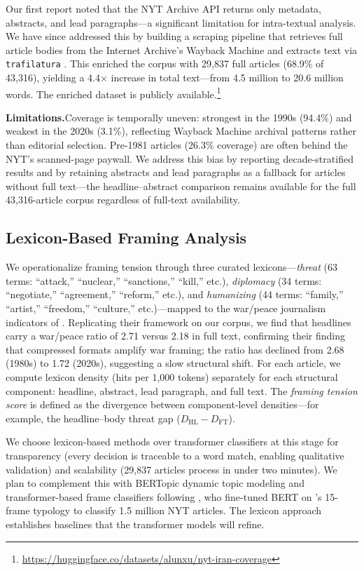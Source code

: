 \documentclass{dhnbpub}
\begin{document}
Our first report noted that the NYT Archive API returns only metadata, abstracts, and lead paragraphs---a significant limitation for intra-textual analysis. We have since addressed this by building a scraping pipeline that retrieves full article bodies from the Internet Archive's Wayback Machine and extracts text via \texttt{trafilatura} \citep{Barbaresi2021}. This enriched the corpus with 29,837 full articles (68.9\% of 43,316), yielding a 4.4$\times$ increase in total text---from 4.5 million to 20.6 million words. The enriched dataset is publicly available.\footnote{\url{https://huggingface.co/datasets/alunxu/nyt-iran-coverage}}

\textbf{Limitations.}\quad Coverage is temporally uneven: strongest in the 1990s (94.4\%) and weakest in the 2020s (3.1\%), reflecting Wayback Machine archival patterns rather than editorial selection. Pre-1981 articles (26.3\% coverage) are often behind the NYT's scanned-page paywall. We address this bias by reporting decade-stratified results and by retaining abstracts and lead paragraphs as a fallback for articles without full text---the headline--abstract comparison remains available for the full 43,316-article corpus regardless of full-text availability.

\subsection{Lexicon-Based Framing Analysis}

We operationalize framing tension through three curated lexicons---\emph{threat} (63 terms: ``attack,'' ``nuclear,'' ``sanctions,'' ``kill,'' etc.), \emph{diplomacy} (34 terms: ``negotiate,'' ``agreement,'' ``reform,'' etc.), and \emph{humanizing} (44 terms: ``family,'' ``artist,'' ``freedom,'' ``culture,'' etc.)---mapped to the war/peace journalism indicators of \citet{LeeMaslog2005}. Replicating their framework on our corpus, we find that headlines carry a war/peace ratio of 2.71 versus 2.18 in full text, confirming their finding that compressed formats amplify war framing; the ratio has declined from 2.68 (1980s) to 1.72 (2020s), suggesting a slow structural shift. For each article, we compute lexicon density (hits per 1,000 tokens) separately for each structural component: headline, abstract, lead paragraph, and full text. The \emph{framing tension score} is defined as the divergence between component-level densities---for example, the headline--body threat gap ($D_{\text{HL}} - D_{\text{FT}}$).

We choose lexicon-based methods over transformer classifiers at this stage for transparency (every decision is traceable to a word match, enabling qualitative validation) and scalability (29,837 articles process in under two minutes). We plan to complement this with BERTopic dynamic topic modeling \citep{Grootendorst2022} and transformer-based frame classifiers following \citet{Kwak2020}, who fine-tuned BERT on \citeauthor{Card2015}'s \citeyearpar{Card2015} 15-frame typology to classify 1.5 million NYT articles. The lexicon approach establishes baselines that the transformer models will refine.
\end{document}
